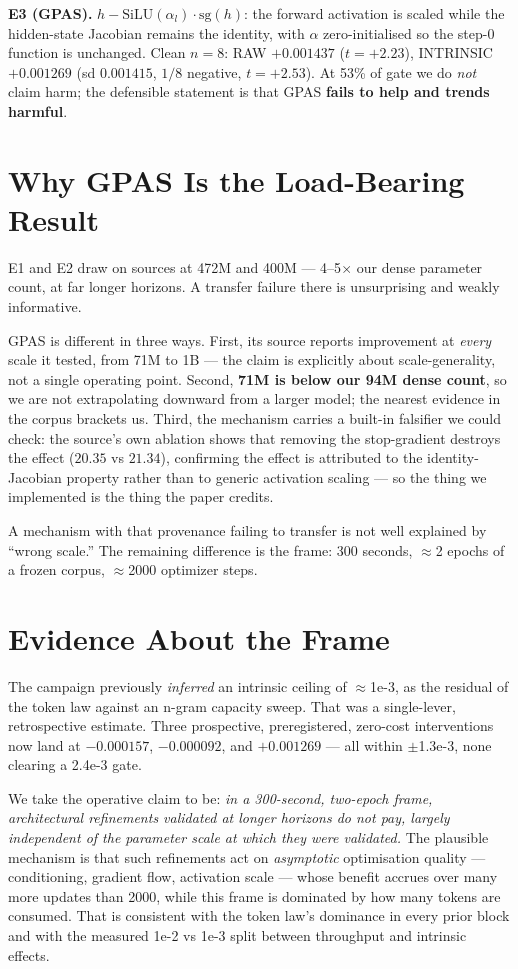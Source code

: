 \documentclass{article}
\begin{document}
\textbf{E3 (GPAS).} $h - \mathrm{SiLU}(\alpha_l)\cdot\mathrm{sg}(h)$: the forward activation is scaled while the hidden-state Jacobian remains the identity, with $\alpha$ zero-initialised so the step-0 function is unchanged. Clean $n{=}8$: RAW $+0.001437$ ($t=+2.23$), INTRINSIC $+0.001269$ (sd $0.001415$, $1/8$ negative, $t=+2.53$). At 53\% of gate we do \emph{not} claim harm; the defensible statement is that GPAS \textbf{fails to help and trends harmful}.

\section{Why GPAS Is the Load-Bearing Result}
E1 and E2 draw on sources at 472M and 400M --- 4--5$\times$ our dense parameter count, at far longer horizons. A transfer failure there is unsurprising and weakly informative.

GPAS is different in three ways. First, its source reports improvement at \emph{every} scale it tested, from 71M to 1B --- the claim is explicitly about scale-generality, not a single operating point. Second, \textbf{71M is below our 94M dense count}, so we are not extrapolating downward from a larger model; the nearest evidence in the corpus brackets us. Third, the mechanism carries a built-in falsifier we could check: the source's own ablation shows that removing the stop-gradient destroys the effect ($20.35$ vs $21.34$), confirming the effect is attributed to the identity-Jacobian property rather than to generic activation scaling --- so the thing we implemented is the thing the paper credits.

A mechanism with that provenance failing to transfer is not well explained by ``wrong scale.'' The remaining difference is the frame: 300 seconds, $\approx$2 epochs of a frozen corpus, $\approx$2000 optimizer steps.

\section{Evidence About the Frame}\label{sec:frame}
The campaign previously \emph{inferred} an intrinsic ceiling of $\approx$1e-3, as the residual of the token law against an n-gram capacity sweep. That was a single-lever, retrospective estimate. Three prospective, preregistered, zero-cost interventions now land at $-0.000157$, $-0.000092$, and $+0.001269$ --- all within $\pm$1.3e-3, none clearing a 2.4e-3 gate.

We take the operative claim to be: \emph{in a 300-second, two-epoch frame, architectural refinements validated at longer horizons do not pay, largely independent of the parameter scale at which they were validated.} The plausible mechanism is that such refinements act on \emph{asymptotic} optimisation quality --- conditioning, gradient flow, activation scale --- whose benefit accrues over many more updates than 2000, while this frame is dominated by how many tokens are consumed. That is consistent with the token law's dominance in every prior block and with the measured 1e-2 vs 1e-3 split between throughput and intrinsic effects.
\end{document}
